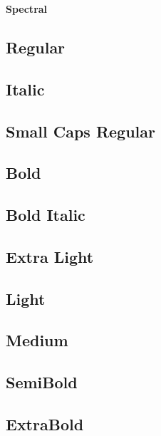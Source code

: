 \documentclass{article}
\begin{document}
\begin{center}\huge
\textbf{Spectral}
\end{center}


\subsection*{Regular}
\lipsum[1]

\subsection*{Italic}
\textit{\lipsum[2]}


\subsection*{Small Caps Regular}
\textsc{\lipsum[5]}

\subsection*{Bold}
\textbf{\lipsum[3]}

\subsection*{Bold Italic}
\textbf{\emph{\lipsum[4]}}

\subsection*{Extra Light}
{\spectralextralight\lipsum[5]}

\subsection*{Light}
{\spectrallight\lipsum[6]}

\subsection*{Medium}
{\spectralmedium\lipsum[7]}

\subsection*{SemiBold}
{\spectralsemibold\lipsum[8]}

\subsection*{ExtraBold}
{\spectralextrabold\lipsum[9]}
\end{document}
